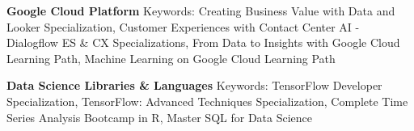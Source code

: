\documentclass[a4paper,9pt]{extarticle}
\begin{document}
\noindent
\textbf{Google Cloud Platform}
Keywords: Creating Business Value with Data and Looker Specialization, Customer Experiences with Contact Center AI - Dialogflow ES \& CX Specializations, From Data to Insights with Google Cloud Learning Path, Machine Learning on Google Cloud Learning Path

\noindent
\textbf{Data Science Libraries \& Languages}
Keywords: TensorFlow Developer Specialization, TensorFlow: Advanced Techniques Specialization, Complete Time Series Analysis Bootcamp in R, Master SQL for Data Science
\end{document}
